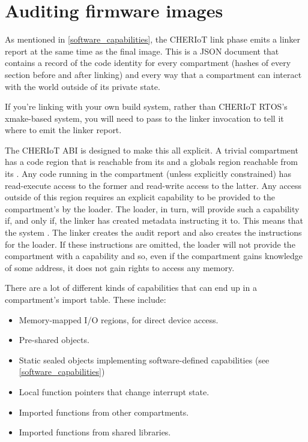 \chapter[label="cheriot-audit"]{Auditing firmware images}

As mentioned in \ref{software_capabilities}, the CHERIoT link phase emits a linker report at the same time as the final image.
This is a JSON document that contains a record of the code identity for every compartment (hashes of every section before and after linking) and every way that a compartment can interact with the world outside of its private state.

\begin{note}
	If you're linking with your own build system, rather than CHERIoT RTOS's xmake-based system, you will need to pass  to the linker invocation to tell it where to emit the linker report.
\end{note}

The CHERIoT ABI is designed to make this all explicit.
A trivial compartment has a code region that is reachable from its  and a globals region reachable from its .
Any code running in the compartment (unless explicitly constrained) has read-execute access to the former and read-write access to the latter.
Any access outside of this region requires an explicit capability to be provided to the compartment's  by the loader.
The loader, in turn, will provide such a capability if, and only if, the linker has created metadata instructing it to.
This means that the system .
The linker creates the audit report and also creates the instructions for the loader.
If these instructions are omitted, the loader will not provide the compartment with a capability and so, even if the compartment gains knowledge of some address, it does not gain rights to access any memory.

There are a lot of different kinds of capabilities that can end up in a compartment's import table.
These include:

\begin{itemize}
	\item{Memory-mapped I/O regions, for direct device access.}
	\item{Pre-shared objects.}
	\item{Static sealed objects implementing software-defined capabilities (see \ref{software_capabilities})}
	\item{Local function pointers that change interrupt state.}
	\item{Imported functions from other compartments.}
	\item{Imported functions from shared libraries.}
\end{itemize}

